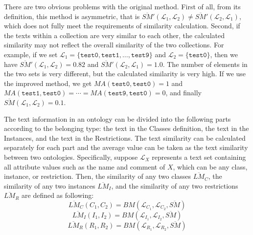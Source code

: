 \documentclass[twoside]{article}
\begin{document}
There are two obvious problems with the original method.
First of all, from its definition, this method is asymmetric, that is $\overline{SM}'(\mathcal{L}_1,\mathcal{L}_2) \neq \overline{SM}'(\mathcal{L}_2,\mathcal{L}_1)$, which does not fully meet the requirements of similarity calculation.
Second, if the texts within a collection are very similar to each other, the calculated similarity may not reflect the overall similarity of the two collections.
For example, if we set $\mathcal{L}_1 = \{ \texttt{test0}, \texttt{test1}, \dots, \texttt{test9} \}$ and $\mathcal{L}_2 = \{ \texttt{test0} \}$, then we have $\overline{SM}'(\mathcal{L}_1,\mathcal{L}_2) = 0.82$ and $\overline{SM}'(\mathcal{L}_2,\mathcal{L}_1) = 1.0$.
The number of elements in the two sets is very different, but the calculated similarity is very high.
If we use the improved method, we get $MA(\texttt{test0},\texttt{test0}) = 1$ and $MA(\texttt{test1},\texttt{test0}) = \cdots = MA(\texttt{test9},\texttt{test0}) = 0$, and finally $\overline{SM}(\mathcal{L}_1,\mathcal{L}_2) = 0.1$.

The text information in an ontology can be divided into the following parts according to the belonging type:
the text in the Classes definition, the text in the Instances, and the text in the Restrictions.
The text similarity can be calculated separately for each part and the average value can be taken as the text similarity between two ontologies.
Specifically, suppose $\mathcal{L}_{X}$ represents a text set containing all attribute values such as the name and comment of $X$, which can be any class, instance, or restriction.
Then, the similarity of any two classes $\overline{L M}_{C}$, the similarity of any two instances $\overline{L M}_{I}$, and the similarity of any two restrictions $\overline{L M}_{R}$ are defined as following:
\begin{equation}
\overline{L M}_{C}\left(C_{1}, C_{2}\right)=B M\left(\mathcal{L}_{C_{1}}, \mathcal{L}_{C_{2}}, \overline{S M}\right)
\end{equation}
\begin{equation}
\overline{L M}_{I}\left(I_{1}, I_{2}\right)=B M\left(\mathcal{L}_{I_{1}}, \mathcal{L}_{I_{2}}, \overline{S M}\right)
\end{equation}
\begin{equation}
\overline{L M}_{R}\left(R_{1}, R_{2}\right)=B M\left(\mathcal{L}_{R_{1}}, \mathcal{L}_{R_{2}}, \overline{S M}\right)
\end{equation}
\end{document}
